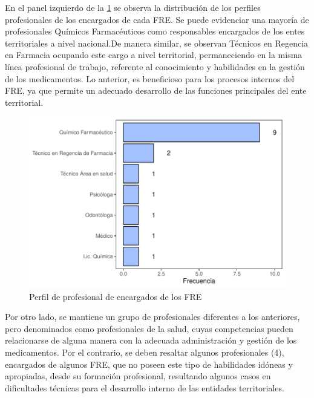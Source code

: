 \documentclass[
]{book}
\begin{document}
En el panel izquierdo de la \ref{fig:perfilProfesionalEncargado} se observa la distribución de los perfiles profesionales de los encargados de cada FRE. Se puede evidenciar una mayoría de profesionales Químicos Farmacéuticos como responsables encargados de los entes territoriales a nivel nacional.De manera similar, se observan Técnicos en Regencia en Farmacia ocupando este cargo a nivel territorial, permaneciendo en la misma línea profesional de trabajo, referente al conocimiento y habilidades en la gestión de los medicamentos. Lo anterior, es beneficioso para los procesos internos del FRE, ya que permite un adecuado desarrollo de las funciones principales del ente territorial.

\begin{figure}
\includegraphics[width=1\linewidth]{InformeFinal_files/figure-latex/perfilProfesionalEncargado-1} \caption{Perfil de profesional de encargados de los FRE}\label{fig:perfilProfesionalEncargado}
\end{figure}

Por otro lado, se mantiene un grupo de profesionales diferentes a los anteriores, pero denominados como profesionales de la salud, cuyas competencias pueden relacionarse de alguna manera con la adecuada administración y gestión de los medicamentos. Por el contrario, se deben resaltar algunos profesionales (4), encargados de algunos FRE, que no poseen este tipo de habilidades idóneas y apropiadas, desde su formación profesional, resultando algunos casos en dificultades técnicas para el desarrollo interno de las entidades territoriales.
\end{document}

